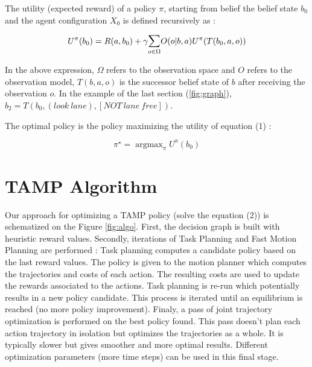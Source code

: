 \documentclass[conference]{IEEEtran}
\DeclareMathOperator*{\argmaxB}{argmax}   %
\begin{document}
The utility (expected reward) of a policy $\pi$, starting from belief the belief state $b_0$ and the agent configuration $X_0$ is defined recursively as :

\begin{equation}
U^{\pi}(b_0) = \\R(a, b_0) + \gamma \mathlarger{\sum}_{o \in \Omega } O( o | b, a ) U^{\pi}(T(b_0, a, o))
\end{equation} 

In the above expression, $\Omega$ refers to the observation space and $O$ refers to the observation model,  $T(b, a, o)$ is the successor belief state of $b$ after receiving the observation $o$. In the example of the last section (\ref{fig:graph}), $b_2 = T(b_0, (look\ lane), [NOT\ lane\ free])$.

The optimal policy is the policy maximizing the utility of equation (1) :

\begin{equation}
\pi^{\star} = \argmaxB_{\pi} U^{\pi}(b_0)
\end{equation} 

\section{TAMP Algorithm}

Our approach for optimizing a TAMP policy (solve the equation (2)) is schematized on the Figure \ref{fig:algo}. First, the decision graph is built with heuristic reward values. Secondly, iterations of Task Planning and Fast Motion Planning are performed : Task planning computes a candidate policy based on the last reward values. The policy is given to the motion planner which computes the trajectories and costs of each action. The resulting costs are used to update the rewards associated to the actions. Task planning is re-run which potentially results in a new policy candidate. This process is iterated until an equilibrium is reached (no more policy improvement).
Finaly, a pass of joint trajectory optimization is performed on the best policy found. This pass doesn't plan each action trajectory in isolation but optimizes the trajectories as a whole. It is typically slower but gives smoother and more optimal results. Different optimization parameters (more time steps) can be used in this final stage.
\end{document}

